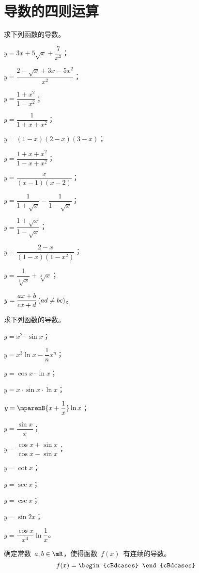\section{导数的四则运算}
\begin{exercise}
\item 求下列函数的导数。
\begin{exlistcols}[3]
  \item $y=3x+5\sqrt x+\dfrac 7{x^3}$；
  \item $y=\dfrac{2-\sqrt x+3x-5x^2}{x^2}$；
  \item $y=\dfrac{1+x^2}{1-x^2}$；
  \item $y=\dfrac1{1+x+x^2}$；
  \item $y=(1-x)(2-x)(3-x)$；
  \item $y=\dfrac{1+x+x^2}{1-x+x^2}$；
  \item $y=\dfrac x{(x-1)(x-2)}$；
  \item $y=\dfrac1{1+\sqrt x}-\dfrac1{1-\sqrt x}$；
  \item $y=\dfrac{1+\sqrt x}{1-\sqrt x}$；
  \item $y=\dfrac{2-x}{(1-x)(1-x^2)}$；
  \item $y=\dfrac1{\sqrt[3]x}+\sqrt[3]x$；
  \item $y=\dfrac{ax+b}{cx+d}\mcond{ad\neq bc}$。
\end{exlistcols}
\item 求下列函数的导数。
\begin{exlistcols}[3]
  \item $y=x^2\cdot\sin x$；
  \item $y=x^3\ln x-\dfrac1nx^n$；
  \item $y=\cos x\cdot\ln x$；
  \item $y=x\cdot\sin x\cdot\ln x$；
  \item $y=\mparenB{x+\dfrac1x}\ln x$；
  \item $y=\dfrac{\sin x}x$；
  \item $y=\dfrac{\cos x+\sin x}{\cos x-\sin x}$；
  \item $y=\cot x$；
  \item $y=\sec x$；
  \item $y=\csc x$；
  \item $y=\sin 2x$；
  \item $y=\dfrac{\cos x}{x^4}\ln\dfrac1x$。
\end{exlistcols}
\item 确定常数~$a,b\in\mR$，使得函数~$f(x)$~有连续的导数。
\[
  f(x)=\begin{cBdcases}

\end{cBdcases}\]
\end{exercise}
